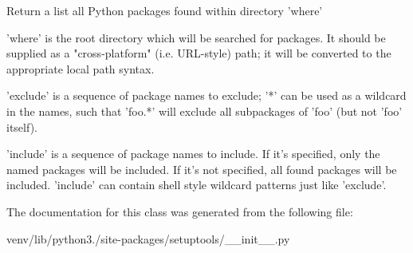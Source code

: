 \begin{DoxyVerb}Return a list all Python packages found within directory 'where'

'where' is the root directory which will be searched for packages.  It
should be supplied as a "cross-platform" (i.e. URL-style) path; it will
be converted to the appropriate local path syntax.

'exclude' is a sequence of package names to exclude; '*' can be used
as a wildcard in the names, such that 'foo.*' will exclude all
subpackages of 'foo' (but not 'foo' itself).

'include' is a sequence of package names to include.  If it's
specified, only the named packages will be included.  If it's not
specified, all found packages will be included.  'include' can contain
shell style wildcard patterns just like 'exclude'.
\end{DoxyVerb}
 

The documentation for this class was generated from the following file\+:\begin{DoxyCompactItemize}
\item 
venv/lib/python3./site-\/packages/setuptools/\+\_\+\+\_\+init\+\_\+\+\_\+.\+py\end{DoxyCompactItemize}
